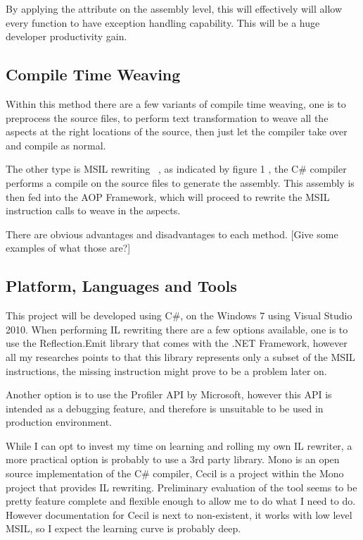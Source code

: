 By applying the attribute on the assembly level, this will effectively will allow every function to have exception handling capability. This will be a huge developer productivity gain.


\subsection{Compile Time Weaving}
Within this method there are a few variants of compile time weaving, one is to preprocess the source files, to perform text transformation to weave all the aspects at the right locations of the source, then just let the compiler take over and compile as normal.

The other type is MSIL rewriting ~\cite{rewrite_msil}, as indicated by figure 1 , the C\# compiler performs a compile on the source files to generate the assembly. This assembly is then fed into the AOP Framework, which will proceed to rewrite the MSIL instruction calls to weave in the aspects.

There are obvious advantages and disadvantages to each method. [Give some examples of what those are?]

\subsection{Platform, Languages and Tools}
This project will be developed using C\#, on the Windows 7 using Visual Studio 2010. When performing IL rewriting there are a few options available, one is to use the Reflection.Emit library that comes with the .NET Framework, however all my researches points to that this library represents only a subset of the MSIL instructions, the missing instruction might prove to be a problem later on.

Another option is to use the Profiler API by Microsoft, however this API is intended as a debugging feature, and therefore is unsuitable to be used in production environment.

While I can opt to invest my time on learning and rolling my own IL rewriter, a more practical option is probably to use a 3rd party library. Mono is an open source implementation of the C\# compiler, Cecil is a project within the Mono project that provides IL rewriting. Preliminary evaluation of the tool seems to be pretty feature complete and flexible enough to allow me to do what I need to do. However documentation for Cecil is next to non-existent, it works with low level MSIL, so I expect the learning curve is probably deep.

